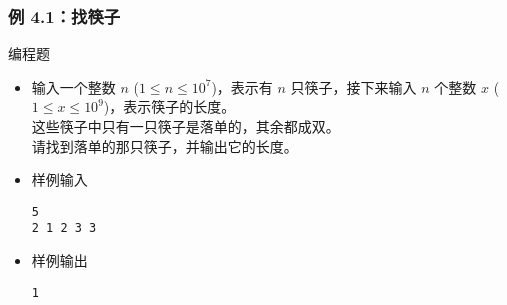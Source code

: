\begin{frame}[fragile]
    \frametitle{例 4.1：找筷子}

     {
        

    } {
        \begin{exampleblock}{编程题}
            \begin{itemize}
                \item 输入一个整数 $n$ ($1 \le n \le 10^7$)，表示有 $n$ 只筷子，接下来输入 $n$ 个整数 $x$ ($1 \le x \le 10^9$)，表示筷子的长度。\\
                    这些筷子中只有一只筷子是落单的，其余都成双。\\
                    请找到落单的那只筷子，并输出它的长度。
                    
                \item 样例输入
    
                    \lstinline|5|\\
                    \lstinline|2 1 2 3 3|
    
                \item 样例输出
                
                    \lstinline|1|
    
            \end{itemize}
        \end{exampleblock}
    }

\end{frame}


